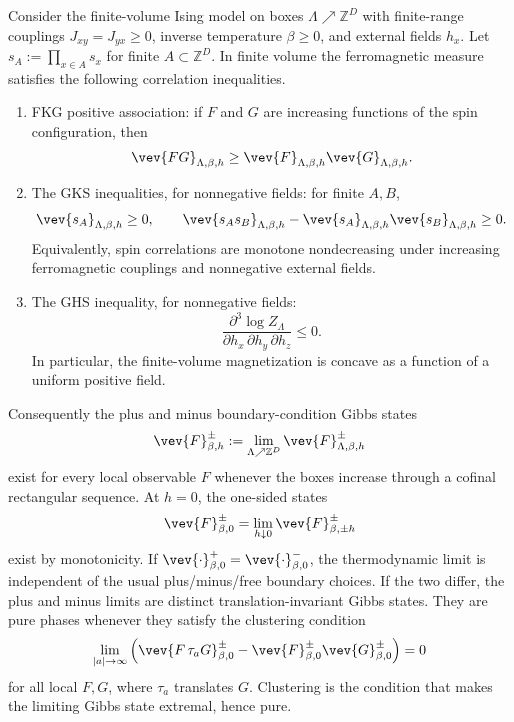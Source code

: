 \begin{quotedtheorem}
\label{qthm:ising-ferromagnetic-thermodynamic-limits}
Consider the finite-volume Ising model on boxes
\(\Lambda\nearrow\mathbb Z^D\) with finite-range couplings
\(J_{xy}=J_{yx}\geq0\), inverse temperature \(\beta\geq0\), and external
fields \(h_x\).  Let \(s_A:=\prod_{x\in A}s_x\) for finite
\(A\subset\mathbb Z^D\).  In finite volume the ferromagnetic measure satisfies
the following correlation inequalities.
\begin{enumerate}[label=(\roman*)]
  \item FKG positive association: if \(F\) and \(G\) are increasing functions
  of the spin configuration, then
  \[
    \vev{FG}_{\Lambda,\beta,h}
    \geq
    \vev{F}_{\Lambda,\beta,h}\vev{G}_{\Lambda,\beta,h}.
  \]
  \item The GKS inequalities, for nonnegative fields: for finite
  \(A,B\),
  \[
    \vev{s_A}_{\Lambda,\beta,h}\geq0,
    \qquad
    \vev{s_A s_B}_{\Lambda,\beta,h}
    -
    \vev{s_A}_{\Lambda,\beta,h}\vev{s_B}_{\Lambda,\beta,h}
    \geq0 .
  \]
  Equivalently, spin correlations are monotone nondecreasing under increasing
  ferromagnetic couplings and nonnegative external fields.
  \item The GHS inequality, for nonnegative fields:
  \[
    \frac{\partial^3\log Z_\Lambda}
      {\partial h_x\,\partial h_y\,\partial h_z}
    \leq0 .
  \]
  In particular, the finite-volume magnetization is concave as a function of
  a uniform positive field.
\end{enumerate}
Consequently the plus and minus boundary-condition Gibbs states
\[
  \vev{F}^{\pm}_{\beta,h}
  :=
  \lim_{\Lambda\nearrow\mathbb Z^D}
  \vev{F}_{\Lambda,\beta,h}^{\pm}
\]
exist for every local observable \(F\) whenever the boxes increase through a
cofinal rectangular sequence.  At \(h=0\), the one-sided states
\[
  \vev{F}^{\pm}_{\beta,0}
  =
  \lim_{h\downarrow0}\vev{F}^{\pm}_{\beta,\pm h}
\]
exist by monotonicity.  If \(\vev{\cdot}^{+}_{\beta,0}
=\vev{\cdot}^{-}_{\beta,0}\), the thermodynamic limit is independent of the
usual plus/minus/free boundary choices.  If the two differ, the plus and minus
limits are distinct translation-invariant Gibbs states.  They are pure phases
whenever they satisfy the clustering condition
\[
  \lim_{|a|\to\infty}
  \left(
    \vev{F\,\tau_aG}^{\pm}_{\beta,0}
    -
    \vev{F}^{\pm}_{\beta,0}\vev{G}^{\pm}_{\beta,0}
  \right)
  =0
\]
for all local \(F,G\), where \(\tau_a\) translates \(G\).  Clustering is the
condition that makes the limiting Gibbs state extremal, hence pure.
\end{quotedtheorem}

